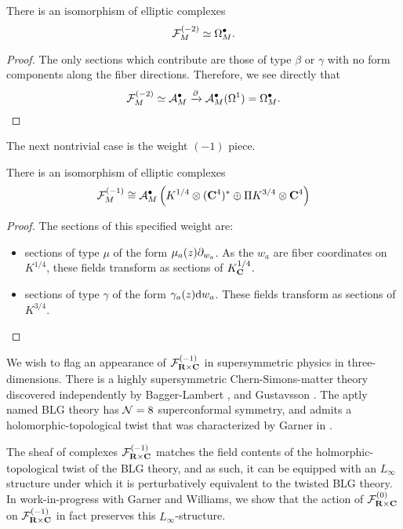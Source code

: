 \documentclass[../main.tex]{subfiles}
\begin{document}
\begin{lem}
There is an isomorphism of elliptic complexes \[\mathcal{F}^{(-2)}_{M} \simeq \Omega^\bullet_{M}.\]
\end{lem}
\begin{proof}
The only sections which contribute are those of type $\beta$ or $\gamma$ with no form components along the fiber directions. Therefore, we see directly that \[\mathcal{F}^{(-2)}_{M} \simeq \mathcal A^\bullet_M \xrightarrow{\partial} \mathcal A^\bullet_M(\Omega^1) = \Omega^\bullet_M.\] 
\end{proof}

\parsec[] The next nontrivial case is the weight ${(-1)}$ piece. 

\begin{lem}
There is an isomorphism of elliptic complexes 
\[ \mathcal{F}^{(-1)}_{M} \cong \mathcal A^\bullet_M \left (K^{1/4}\otimes (\mathbf{C}^4)^* \oplus \Pi K^{3/4}\otimes \mathbf{C}^4 \right ) \]
\end{lem}
\begin{proof}
The sections of this specified weight are:
\begin{itemize}
\item sections of type $\mu$ of the form $\mu_a(z) \partial_{w_a}$. 
As the $w_a$ are fiber coordinates on $K^{1/4}$, these fields transform as sections of $K^{1/4}_{\mathbf{C}}$.
\item sections of type $\gamma$ of the form $\gamma_a(z) \mathrm{d} w_a$. 
These fields transform as sections of $K^{3/4}$. 
\end{itemize}
\end{proof}

\parsec[]
We wish to flag an appearance of $\mathcal{F}^{(-1)}_{\mathbf{R}\times \mathbf{C}}$ in supersymmetric physics in three-dimensions. There is a highly supersymmetric Chern-Simons-matter theory discovered independently by Bagger-Lambert \cite{Bagger_2007}, \cite{Bagger:2007jr} and Gustavsson \cite{Gustavsson:2007vu}. The aptly named BLG theory has $\mathcal{N}=8$ superconformal symmetry, and admits a holomorphic-topological twist that was characterized by Garner in \cite{Garner2022vds}.

The sheaf of complexes $\mathcal{F}^{(-1)}_{\mathbf{R}\times \mathbf{C}}$ matches the field contents of the holmorphic-topological twist of the BLG theory, and as such, it can be equipped with an $L_\infty$ structure under which it is perturbatively equivalent to the twisted BLG theory. In work-in-progress with Garner and Williams, we show that the action of $\mathcal{F}^{(0)}_{\mathbf{R}\times \mathbf{C}}$ on $\mathcal{F}^{(-1)}_{\mathbf{R}\times \mathbf{C}}$ in fact preserves this $L_\infty$-structure. 
\end{document}
